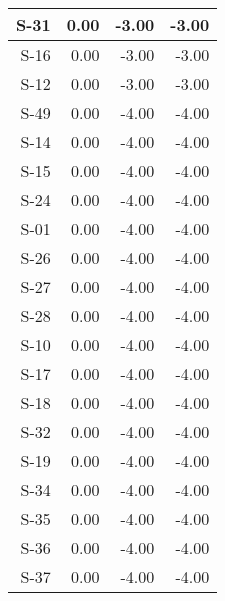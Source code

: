 \begin{tabular}{ | r | r | r | r | }
    \hline
                  S-31  &            0.00  &           -3.00  &           -3.00  \\
    \hline
                  S-16  &            0.00  &           -3.00  &           -3.00  \\
    \hline
                  S-12  &            0.00  &           -3.00  &           -3.00  \\
    \hline
                  S-49  &            0.00  &           -4.00  &           -4.00  \\
    \hline
                  S-14  &            0.00  &           -4.00  &           -4.00  \\
    \hline
                  S-15  &            0.00  &           -4.00  &           -4.00  \\
    \hline
                  S-24  &            0.00  &           -4.00  &           -4.00  \\
    \hline
                  S-01  &            0.00  &           -4.00  &           -4.00  \\
    \hline
                  S-26  &            0.00  &           -4.00  &           -4.00  \\
    \hline
                  S-27  &            0.00  &           -4.00  &           -4.00  \\
    \hline
                  S-28  &            0.00  &           -4.00  &           -4.00  \\
    \hline
                  S-10  &            0.00  &           -4.00  &           -4.00  \\
    \hline
                  S-17  &            0.00  &           -4.00  &           -4.00  \\
    \hline
                  S-18  &            0.00  &           -4.00  &           -4.00  \\
    \hline
                  S-32  &            0.00  &           -4.00  &           -4.00  \\
    \hline
                  S-19  &            0.00  &           -4.00  &           -4.00  \\
    \hline
                  S-34  &            0.00  &           -4.00  &           -4.00  \\
    \hline
                  S-35  &            0.00  &           -4.00  &           -4.00  \\
    \hline
                  S-36  &            0.00  &           -4.00  &           -4.00  \\
    \hline
                  S-37  &            0.00  &           -4.00  &           -4.00  \\

\end{tabular}
